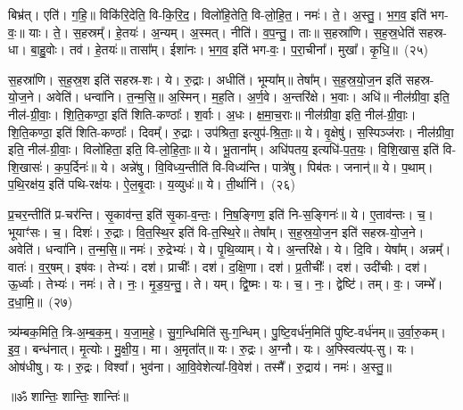 बिभ्र॑त्। एति॑। ग॒हि॒॥ 
विकि॑रि॒देति॒ वि-कि॒रि॒द॒। विलो॑हि॒तेति॒ वि-लो॒हि॒त॒। नमः॑। ते॒। अ॒स्तु॒। भ॒ग॒व॒ इति॑ भग-वः॒॥ 
याः। ते॒। स॒हस्रम्᳚। हे॒तयः॑। अ॒न्यम्। अ॒स्मत्। नीति॑। व॒प॒न्तु॒। ताः॥ 
स॒हस्रा॑णि। स॒ह॒स्र॒धेति॑ सहस्र-धा। बा॒हु॒वोः। तव॑। हे॒तयः॑॥ 
तासा᳚म्। ईशा॑नः। भ॒ग॒व॒ इति॑ भग-वः॒। प॒रा॒चीना᳚। मुखा᳚। कृ॒धि॒॥~(२५)


स॒हस्रा॑णि। स॒ह॒स्र॒श इति॑ सहस्र-शः। ये। रु॒द्राः। अधीति॑। भूम्या᳚म्॥ 
तेषा᳚म्। स॒ह॒स्र॒यो॒ज॒न इति॑ सहस्र-यो॒ज॒ने। अवेति॑। धन्वा॑नि। त॒न्म॒सि॒॥ 
अ॒स्मिन्। म॒ह॒ति। अ॒र्ण॒वे। अ॒न्तरि॑क्षे। भ॒वाः। अधि॑॥ 
नील॑ग्रीवा॒ इति॒ नील॑-ग्री॒वाः॒। शि॒ति॒कण्ठा॒ इति॑ शिति-कण्ठाः᳚। श॒र्वाः। अ॒धः। क्ष॒मा॒च॒राः॥ 
नील॑ग्रीवा॒ इति॒ नील॑-ग्री॒वाः॒। शि॒ति॒कण्ठा॒ इति॑ शिति-कण्ठाः᳚। दिवम्᳚। रु॒द्राः। उप॑श्रिता॒ इत्युप॑-श्रि॒ताः॒॥ 
ये। वृ॒क्षेषु॑। स॒स्पिञ्ज॑राः। नील॑ग्रीवा॒ इति॒ नील॑-ग्री॒वाः॒। विलो॑हिता॒ इति॒ वि-लो॒हि॒ताः॒॥ 
ये। भू॒ताना᳚म्। अधि॑पतय॒ इत्यधि॑-प॒त॒यः॒। वि॒शि॒खास॒ इति॑ वि-शि॒खासः॑। क॒प॒र्दिनः॑॥ 
ये। अन्ने॑षु। वि॒विध्य॒न्तीति॑ वि-विध्य॑न्ति। पात्रे॑षु। पिब॑तः। जनान्॑॥ 
ये। प॒थाम्। प॒थि॒रक्ष॑य॒ इति॑ पथि-रक्ष॑यः। ऐ॒ल॒बृ॒दाः। य॒व्युधः॑॥ 
ये। ती॒र्थानि॑।~(२६)


प्र॒चर॒न्तीति॑ प्र-चर॑न्ति। सृ॒काव॑न्त॒ इति॑ सृ॒का-व॒न्तः॒। नि॒ष॒ङ्गिण॒ इति॑ नि-स॒ङ्गिनः॑॥ 
ये। ए॒ताव॑न्तः। च॒। भूयाꣳ॑सः। च॒। दिशः॑। रु॒द्राः। वि॒त॒स्थि॒र इति॑ वि-त॒स्थि॒रे॥ 
तेषा᳚म्। स॒ह॒स्र॒यो॒ज॒न इति॑ सहस्र-यो॒ज॒ने। अवेति॑। धन्वा॑नि। त॒न्म॒सि॒॥ 
नमः॑। रु॒द्रेभ्यः॑। ये। पृ॒थि॒व्याम्। ये। अ॒न्तरि॑क्षे। ये। दि॒वि। येषा᳚म्। अन्नम्᳚। वातः॑। व॒र्॒‌षम्।
 इष॑वः। तेभ्यः॑। दश॑। प्राचीः᳚। दश॑। द॒क्षि॒णा। दश॑। प्र॒तीचीः᳚। दश॑। उदी॑चीः। दश॑। ऊ॒र्ध्वाः।
  तेभ्यः॑। नमः॑। ते। नः॒। मृ॒ड॒य॒न्तु॒। ते। यम्। द्वि॒ष्मः। यः। च॒। नः॒। द्वेष्टि॑। तम्। वः॒। जम्भे᳚। द॒धा॒मि॒॥~(२७)


त्र्य॑म्बक॒मिति॒ त्रि-अ॒म्ब॒क॒म्॒। य॒जा॒म॒हे॒। सु॒ग॒न्धिमिति॑ सु-ग॒न्धिम्। पु॒ष्टि॒वर्ध॑न॒मिति॑ पुष्टि-वर्ध॑नम्॥ 
उ॒र्वा॒रु॒कम्। इ॒व॒। बन्ध॑नात्। मृ॒त्योः। मु॒क्षी॒य॒। मा। अ॒मृता᳚त्॥ 
यः। रु॒द्रः। अ॒ग्नौ। यः। अ॒फ्स्वित्य॑प्-सु। यः। ओष॑धीषु। यः। रु॒द्रः। विश्वा᳚। भुव॑ना। आ॒वि॒वेशेत्या᳚-वि॒वेश॑। तस्मै᳚। रु॒द्राय॑। नमः॑। अ॒स्तु॒॥


\centerline{॥ॐ शान्तिः॒ शान्तिः॒ शान्तिः॑॥}

\hyperref[sec:start_RudraPadaPatha]{\closesection}
